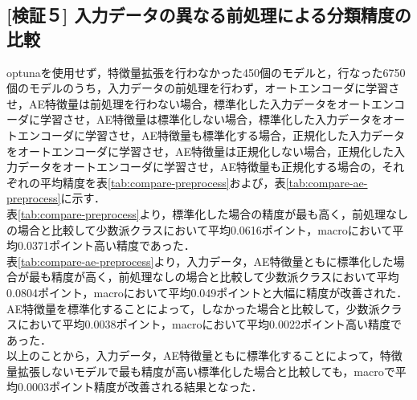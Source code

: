 \subsection{[検証５] 入力データの異なる前処理による分類精度の比較}
optunaを使用せず，特徴量拡張を行わなかった450個のモデルと，行なった6750個のモデルのうち，入力データの前処理を行わず，オートエンコーダに学習させ，AE特徴量は前処理を行わない場合，標準化した入力データをオートエンコーダに学習させ，AE特徴量は標準化しない場合，標準化した入力データをオートエンコーダに学習させ，AE特徴量も標準化する場合，正規化した入力データをオートエンコーダに学習させ，AE特徴量は正規化しない場合，正規化した入力データをオートエンコーダに学習させ，AE特徴量も正規化する場合の，それぞれの平均精度を表\ref{tab:compare-preprocess}および，表\ref{tab:compare-ae-preprocess}に示す．\\
表\ref{tab:compare-preprocess}より，標準化した場合の精度が最も高く，前処理なしの場合と比較して少数派クラスにおいて平均0.0616ポイント，macroにおいて平均0.0371ポイント高い精度であった．\\
表\ref{tab:compare-ae-preprocess}より，入力データ，AE特徴量ともに標準化した場合が最も精度が高く，前処理なしの場合と比較して少数派クラスにおいて平均0.0804ポイント，macroにおいて平均0.049ポイントと大幅に精度が改善された．\\
AE特徴量を標準化することによって，しなかった場合と比較して，少数派クラスにおいて平均0.0038ポイント，macroにおいて平均0.0022ポイント高い精度であった．\\
以上のことから，入力データ，AE特徴量ともに標準化することによって，特徴量拡張しないモデルで最も精度が高い標準化した場合と比較しても，macroで平均0.0003ポイント精度が改善される結果となった．\\

